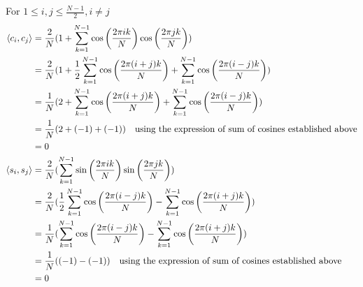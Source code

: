 \documentclass[12pt,twoside]{article}
\begin{document}
\begin{enumerate}
\begin{enumerate}
  For $1 \leq i,j \leq \frac{N-1}{2}, i \neq j$
  \begin{align*}
 \left \langle c_i, c_j\right \rangle		&=	 \frac{2}{N}  (1 + \sum_{k=1}^{N-1} \cos \left( \frac{2 \pi i k }{N} \right) \cos \left( \frac{2 \pi j k }{N} \right)) \\
 					&=      \frac{2}{N}   (1 +  \frac{1}{2}  \sum_{k=1}^{N-1} \cos \left( \frac{2 \pi (i+j) k }{N} \right) + \sum_{k=1}^{N-1}  \cos \left( \frac{2 \pi (i-j) k }{N} \right) )\\
 					&=      \frac{1}{N}  (2 + \sum_{k=1}^{N-1} \cos \left( \frac{2 \pi (i+j) k }{N} \right) + \sum_{k=1}^{N-1}  \cos \left( \frac{2 \pi (i-j) k }{N} \right) )\\
					&= 	 \frac{1}{N}  (2 + (-1) +(-1)) \text{ ~ using the expression of sum of cosines established above} \\
					&= 0 \\
 \left \langle s_i, s_j\right \rangle		&=	 \frac{2}{N}  (\sum_{k=1}^{N-1} \sin \left( \frac{2 \pi i k }{N} \right) \sin \left( \frac{2 \pi j k }{N} \right)) \\
 					&=      \frac{2}{N}   (\frac{1}{2}  \sum_{k=1}^{N-1} \cos \left( \frac{2 \pi (i-j) k }{N} \right) - \sum_{k=1}^{N-1}  \cos \left( \frac{2 \pi (i+j) k }{N} \right) )\\
 					&=      \frac{1}{N}   (\sum_{k=1}^{N-1} \cos \left( \frac{2 \pi (i-j) k }{N} \right) - \sum_{k=1}^{N-1}  \cos \left( \frac{2 \pi (i+j) k }{N} \right) )\\					
 					&=      \frac{1}{N}    ((-1) - (-1)) \text{ ~ using the expression of sum of cosines established above} \\					
					&= 0
  \end{align*}


   \end{enumerate}
 

\end{enumerate}
\end{document}
